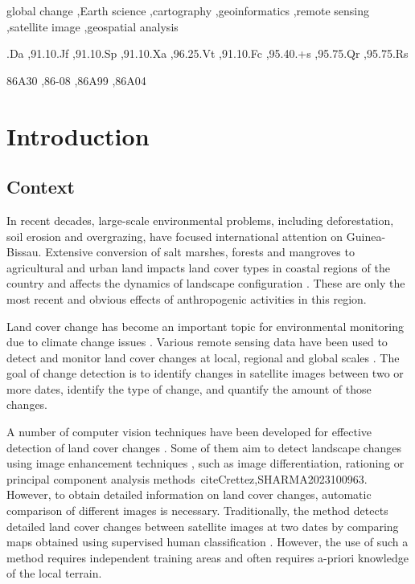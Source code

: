 \documentclass[final,5p,times,twocolumn]{elsarticle}
\begin{document}
\begin{frontmatter}
\begin{keyword}

global change \sep Earth science \sep cartography \sep geoinformatics \sep remote sensing \sep satellite image \sep geospatial analysis

.Da \sep 91.10.Jf \sep 91.10.Sp \sep 91.10.Xa \sep 96.25.Vt \sep 91.10.Fc \sep 95.40.+s \sep 95.75.Qr \sep 95.75.Rs

\MSC 86A30 \sep 86-08 \sep 86A99 \sep 86A04

\end{keyword}

\end{frontmatter}

\section{Introduction}

\subsection{Context}
In recent decades, large-scale environmental problems, including deforestation, soil erosion and overgrazing, have focused international attention on Guinea-Bissau. Extensive conversion of salt marshes, forests and mangroves to agricultural and urban land impacts land cover types in coastal regions of the country \cite{Lopes2022,RAIMUNDOLOPES2022106181,CABRAL2017115} and affects the dynamics of landscape configuration \cite{VASCONCELOS2002139,LOPES2023116804}. These are only the most recent and obvious effects of anthropogenic activities in this region.

Land cover change has become an important topic for environmental monitoring due to climate change issues \cite{Palazot}. Various remote sensing data have been used to detect and monitor land cover changes at local, regional and global scales \cite{Dao}. The goal of change detection is to identify changes in satellite images between two or more dates, identify the type of change, and quantify the amount of those changes.

A number of computer vision techniques have been developed for effective detection of land cover changes \cite{Lenco,Mainguet}. Some of them aim to detect landscape changes using image enhancement techniques \cite{Bouchot}, such as image differentiation, rationing or principal component analysis methods\ cite{Crettez,SHARMA2023100963}. However, to obtain detailed information on land cover changes, automatic comparison of different images is necessary. Traditionally, the method detects detailed land cover changes between satellite images at two dates by comparing maps obtained using supervised human classification \cite{Geroyannis,Blamont}. However, the use of such a method requires independent training areas and often requires a-priori knowledge of the local terrain.
\end{document}
